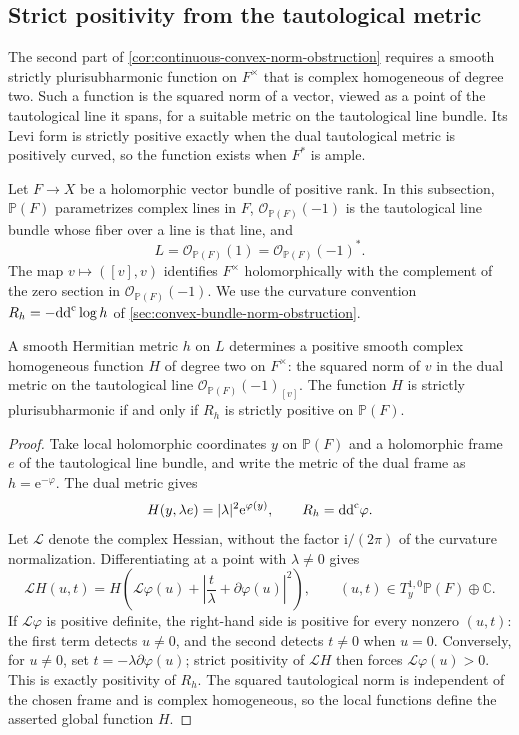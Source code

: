\subsection{Strict positivity from the tautological metric}
\label{subsec:tautological-homogeneous-positivity}

The second part of \cref{cor:continuous-convex-norm-obstruction} requires a smooth strictly plurisubharmonic function on $F^\times$ that is complex homogeneous of degree two. Such a function is the squared norm of a vector, viewed as a point of the tautological line it spans, for a suitable metric on the tautological line bundle. Its Levi form is strictly positive exactly when the dual tautological metric is positively curved, so the function exists when $F^*$ is ample.

Let $F\to X$ be a holomorphic vector bundle of positive rank. In this subsection, $\mathbb P(F)$ parametrizes complex lines in $F$, $\mathcal O_{\mathbb P(F)}(-1)$ is the tautological line bundle whose fiber over a line is that line, and
\[
 L=\mathcal O_{\mathbb P(F)}(1)
   =\mathcal O_{\mathbb P(F)}(-1)^*.
\]
The map $v\mapsto([v],v)$ identifies $F^\times$ holomorphically with the complement of the zero section in $\mathcal O_{\mathbb P(F)}(-1)$. We use the curvature convention $R_h=-\mathrm{dd}^{\mathrm{c}}\log h$ of \cref{sec:convex-bundle-norm-obstruction}.

\begin{lemma}\label{lem:tautological-homogeneous-levi}
A smooth Hermitian metric $h$ on $L$ determines a positive smooth complex homogeneous function $H$ of degree two on $F^\times$: the squared norm of $v$ in the dual metric on the tautological line $\mathcal O_{\mathbb P(F)}(-1)_{[v]}$. The function $H$ is strictly plurisubharmonic if and only if $R_h$ is strictly positive on $\mathbb P(F)$.
\end{lemma}
\begin{proof}
Take local holomorphic coordinates $y$ on $\mathbb P(F)$ and a holomorphic frame $e$ of the tautological line bundle, and write the metric of the dual frame as $h=\mathrm e^{-\varphi}$. The dual metric gives
\[
 H(y,\lambda e)=|\lambda|^2\mathrm e^{\varphi(y)},\qquad
 R_h=\mathrm{dd}^{\mathrm{c}}\varphi.
\]
Let $\mathcal L$ denote the complex Hessian, without the factor $\mathrm i/(2\pi)$ of the curvature normalization. Differentiating at a point with $\lambda\ne0$ gives
\[
 \mathcal L H(u,t)
 =H\left(\mathcal L\varphi(u)+
          \left|\frac{t}{\lambda}+\partial\varphi(u)\right|^2\right),
 \qquad (u,t)\in T_y^{1,0}\mathbb P(F)\oplus\mathbb C.
\]
If $\mathcal L\varphi$ is positive definite, the right-hand side is positive for every nonzero $(u,t)$: the first term detects $u\ne0$, and the second detects $t\ne0$ when $u=0$. Conversely, for $u\ne0$, set $t=-\lambda\partial\varphi(u)$; strict positivity of $\mathcal L H$ then forces $\mathcal L\varphi(u)>0$. This is exactly positivity of $R_h$. The squared tautological norm is independent of the chosen frame and is complex homogeneous, so the local functions define the asserted global function $H$.
\end{proof}

